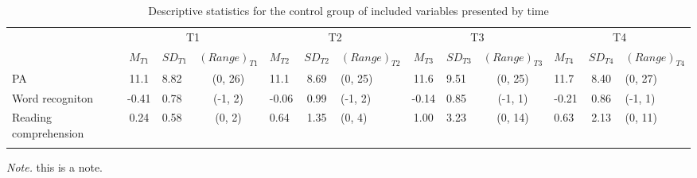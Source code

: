 \documentclass[
  ,
]{article}
\begin{document}
\begin{table}[tbp]

\begin{center}
\begin{threeparttable}

\caption{\label{tab:desc-read-control-table}Descriptive statistics for the control group of included variables presented by time}

\small{

\begin{tabular}{lclclclclclcl}
\toprule
 & \multicolumn{3}{c}{T1} & \multicolumn{3}{c}{T2} & \multicolumn{3}{c}{T3} & \multicolumn{3}{c}{T4} \\
\cmidrule(r){2-4} \cmidrule(r){5-7} \cmidrule(r){8-10} \cmidrule(r){11-13}
  & $M_{T1}$ & $SD_{T1}$ & $(Range)_{T1}$ & $M_{T2}$ & $SD_{T2}$ & $(Range)_{T2}$ & $M_{T3}$ & $SD_{T3}$ & $(Range)_{T3}$ & $M_{T4}$ & $SD_{T4}$ & $(Range)_{T4}$\\
\midrule
PA & 11.1 & 8.82 & (0, 26) & 11.1 & 8.69 & (0, 25) & 11.6 & 9.51 & (0, 25) & 11.7 & 8.40 & (0, 27)\\
Word recogniton & -0.41 & 0.78 & (-1, 2) & -0.06 & 0.99 & (-1, 2) & -0.14 & 0.85 & (-1, 1) & -0.21 & 0.86 & (-1, 1)\\
Reading comprehension & 0.24 & 0.58 & (0, 2) & 0.64 & 1.35 & (0, 4) & 1.00 & 3.23 & (0, 14) & 0.63 & 2.13 & (0, 11)\\
\bottomrule
\addlinespace
\end{tabular}

}

\begin{tablenotes}[para]
\normalsize{\textit{Note.}  this is a note.}
\end{tablenotes}

\end{threeparttable}
\end{center}

\end{table}
\end{document}
